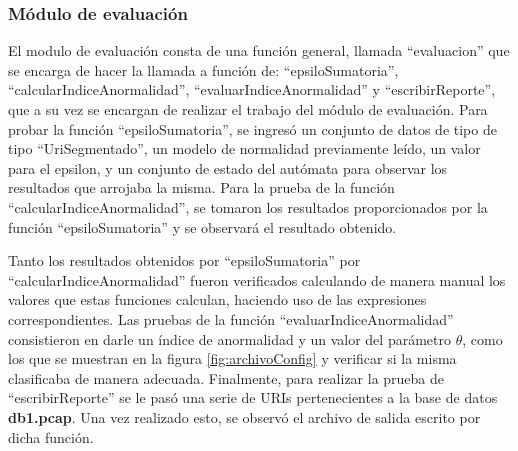 \subsubsection*{Módulo de evaluación}

El modulo de evaluación consta de una función general, llamada ``evaluacion'' que se encarga de hacer la llamada a función de: ``epsiloSumatoria'',
``calcularIndiceAnormalidad'', ``evaluarIndiceAnormalidad'' y ``escribirReporte'', que a su vez se encargan de realizar el trabajo del módulo de evaluación.
Para probar la función ``epsiloSumatoria'', se ingresó un conjunto de datos de tipo de tipo ``UriSegmentado'', un modelo de normalidad previamente leído, un valor para el epsilon, y un conjunto de estado del autómata para observar los resultados que arrojaba la misma.
Para la prueba de la función ``calcularIndiceAnormalidad'', se tomaron
los resultados proporcionados por la función ``epsiloSumatoria'' y se observará el resultado obtenido.

Tanto los resultados obtenidos por ``epsiloSumatoria'' por ``calcularIndiceAnormalidad'' fueron verificados calculando de manera manual los valores
que estas funciones calculan, haciendo uso de las expresiones correspondientes.
Las pruebas de la función ``evaluarIndiceAnormalidad'' consistieron en
darle un  índice de anormalidad y un valor del parámetro $\theta$, como los que
se muestran en la figura \ref{fig:archivoConfig} y verificar si la misma clasificaba de manera adecuada.
Finalmente, para realizar la prueba de ``escribirReporte'' se le pasó una serie de URIs pertenecientes a la base de datos \textbf{db1.pcap}. Una vez realizado
esto, se observó el archivo de salida escrito por dicha función.
